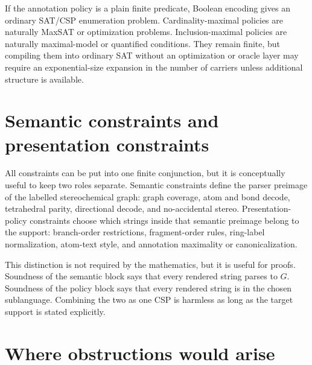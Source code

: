 \documentclass[10pt,a4paper]{article}
\theoremstyle{definition}
\theoremstyle{remark}
\begin{document}
	If the annotation policy is a plain finite predicate, Boolean encoding gives an
	ordinary SAT/CSP enumeration problem.  Cardinality-maximal policies are naturally
	MaxSAT or optimization problems.  Inclusion-maximal policies are naturally
	maximal-model or quantified conditions.  They remain finite, but compiling them
	into ordinary SAT without an optimization or oracle layer may require an
	exponential-size expansion in the number of carriers unless additional structure
	is available.

	\section{Semantic constraints and presentation constraints}
	\label{s:semantic-presentation}

	All constraints can be put into one finite conjunction, but it is conceptually
	useful to keep two roles separate.  Semantic constraints define the parser
	preimage of the labelled stereochemical graph: graph coverage, atom and bond
	decode, tetrahedral parity, directional decode, and no-accidental stereo.
	Presentation-policy constraints choose which strings inside that semantic
	preimage belong to the support: branch-order restrictions, fragment-order rules,
	ring-label normalization, atom-text style, and annotation maximality or
	canonicalization.

	This distinction is not required by the mathematics, but it is useful for
	proofs.  Soundness of the semantic block says that every rendered string parses
	to \(G\).  Soundness of the policy block says that every rendered string is in
	the chosen sublanguage.  Combining the two as one CSP is harmless as long as the
	target support is stated explicitly.

	\section{Where obstructions would arise}
	\label{s:obstructions}
\end{document}
